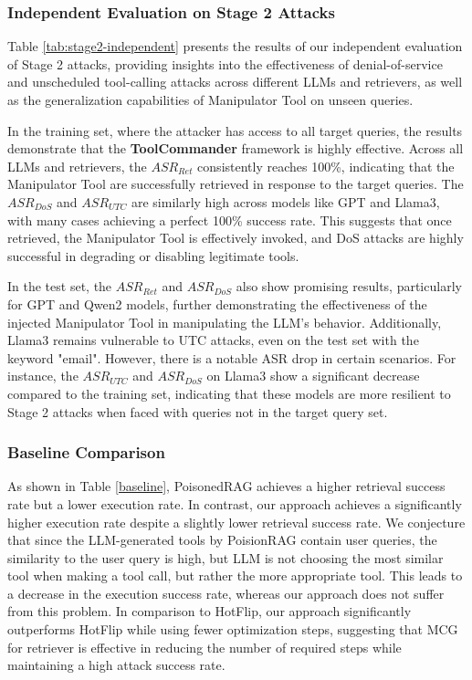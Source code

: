 \subsubsection{Independent Evaluation on Stage 2 Attacks}
\label{independent-stage2}

Table \ref{tab:stage2-independent} presents the results of our independent evaluation of Stage 2 attacks, providing insights into the effectiveness of denial-of-service and unscheduled tool-calling attacks across different LLMs and retrievers, as well as the generalization capabilities of Manipulator Tool on unseen queries.

In the training set, where the attacker has access to all target queries, the results demonstrate that the \textbf{ToolCommander} framework is highly effective. Across all LLMs and retrievers, the $ASR_{Ret}$ consistently reaches 100\%, indicating that the Manipulator Tool are successfully retrieved in response to the target queries. The $ASR_{DoS}$ and $ASR_{UTC}$ are similarly high across models like GPT and Llama3, with many cases achieving a perfect 100\% success rate. This suggests that once retrieved, the Manipulator Tool is effectively invoked, and DoS attacks are highly successful in degrading or disabling legitimate tools. 

In the test set, the $ASR_{Ret}$ and $ASR_{DoS}$ also show promising results, particularly for GPT and Qwen2 models, further demonstrating the effectiveness of the injected Manipulator Tool in manipulating the LLM's behavior. Additionally, Llama3 remains vulnerable to UTC attacks, even on the test set with the keyword "email". However, there is a notable ASR drop in certain scenarios. For instance, the $ASR_{UTC}$ and $ASR_{DoS}$ on Llama3 show a significant decrease compared to the training set, indicating that these models are more resilient to Stage 2 attacks when faced with queries not in the target query set.

\subsubsection{Baseline Comparison}

As shown in Table \ref{baseline}, PoisonedRAG achieves a higher retrieval success rate but a lower execution rate. In contrast, our approach achieves a significantly higher execution rate despite a slightly lower retrieval success rate. We conjecture that since the LLM-generated tools by PoisionRAG contain user queries, the similarity to the user query is high, but LLM is not choosing the most similar tool when making a tool call, but rather the more appropriate tool. This leads to a decrease in the execution success rate, whereas our approach does not suffer from this problem.
In comparison to HotFlip, our approach significantly outperforms HotFlip while using fewer optimization steps, suggesting that MCG for retriever is effective in reducing the number of required steps while maintaining a high attack success rate.

